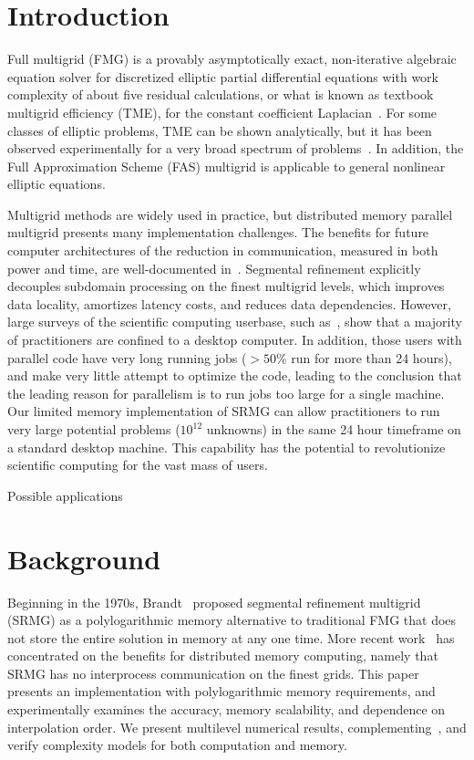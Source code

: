 \section{Introduction}

Full multigrid (FMG) is a provably asymptotically exact, non-iterative algebraic equation solver for discretized
elliptic partial differential equations with work complexity of about five residual calculations, or what is known as
textbook multigrid efficiency (TME), for the constant coefficient Laplacian~\cite{BrandtDiskin1994}. For some classes of
elliptic problems, TME can be shown analytically, but it has been observed experimentally for a very broad spectrum of
problems~\cite{ThomasDiskinBrandt2001,trottenberg2001multigrid,Adams-10a}. In addition, the Full Approximation Scheme
(FAS) multigrid is applicable to general nonlinear elliptic equations.

Multigrid methods are widely used in practice, but distributed memory parallel multigrid presents many implementation
challenges. The benefits for future computer architectures of the reduction in communication, measured in both power and
time, are well-documented in~\cite{AdamsBrownKnepleySamtaney2016}. Segmental refinement explicitly decouples subdomain
processing on the finest multigrid levels, which improves data locality, amortizes latency costs, and reduces data
dependencies. However, large surveys of the scientific computing userbase, such as~\cite{PrabhuEtAl2011}, show that a
majority of practitioners are confined to a desktop computer. In addition, those users with parallel code have very long
running jobs (${} > 50$\% run for more than 24 hours), and make very little attempt to optimize the code, leading to the
conclusion that the leading reason for parallelism is to run jobs too large for a single machine. Our limited memory
implementation of SRMG can allow practitioners to run very large potential problems ($10^{12}$ unknowns) in the same 24
hour timeframe on a standard desktop machine. This capability has the potential to revolutionize scientific computing
for the vast mass of users.

Possible applications

\section{Background}

Beginning in the 1970s, Brandt~\cite{Brandt77,DinarThesis1979,brandt1984} proposed segmental refinement multigrid (SRMG)
as a polylogarithmic memory alternative to traditional FMG that does not store the entire solution in memory at any one
time. More recent work~\cite{BrandtDiskin1994,MohrRude1998,Mohr2000,AdamsBrownKnepleySamtaney2016} has concentrated on
the benefits for distributed memory computing, namely that SRMG has no interprocess communication on the finest
grids. This paper presents an implementation with polylogarithmic memory requirements, and experimentally examines the
accuracy, memory scalability, and dependence on interpolation order. We present multilevel numerical results,
complementing~\cite{AdamsBrownKnepleySamtaney2016}, and verify complexity models for both computation and memory.

